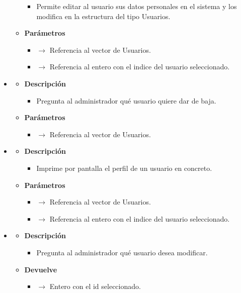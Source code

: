 \begin{itemize}
\begin{itemize}
\begin{itemize}
			\item Permite editar al usuario sus datos personales en el sistema y los modifica en la estructura del tipo Usuarios.
		\end{itemize}
        \item \textbf{Parámetros}
		\begin{itemize}
			\item {} $\rightarrow$ Referencia al vector de Usuarios.
            \item {} $\rightarrow$ Referencia al entero con el indice del usuario seleccionado.
		\end{itemize}
	\end{itemize}
    \newpage
    \item{}
	\begin{itemize}
		\item \textbf{Descripción}
        \begin{itemize}
			\item Pregunta al administrador qué usuario quiere dar de baja.
		\end{itemize}
        \item \textbf{Parámetros}
		\begin{itemize}
			\item {} $\rightarrow$ Referencia al vector de Usuarios.
		\end{itemize}
	\end{itemize}
    \item{}
	\begin{itemize}
		\item \textbf{Descripción}
        \begin{itemize}
			\item Imprime por pantalla el perfil de un usuario en concreto.
		\end{itemize}
        \item \textbf{Parámetros}
		\begin{itemize}
			\item {} $\rightarrow$ Referencia al vector de Usuarios.
            \item {} $\rightarrow$ Referencia al entero con el indice del usuario seleccionado.
		\end{itemize}
	\end{itemize}
    \item{}
	\begin{itemize}
		\item \textbf{Descripción}
        \begin{itemize}
			\item Pregunta al administrador qué usuario desea modificar.
		\end{itemize}
        \item \textbf{Devuelve}
		\begin{itemize}
			\item {} $\rightarrow$ Entero con el id seleccionado.
		\end{itemize}
	\end{itemize}
\end{itemize}
\newpage
